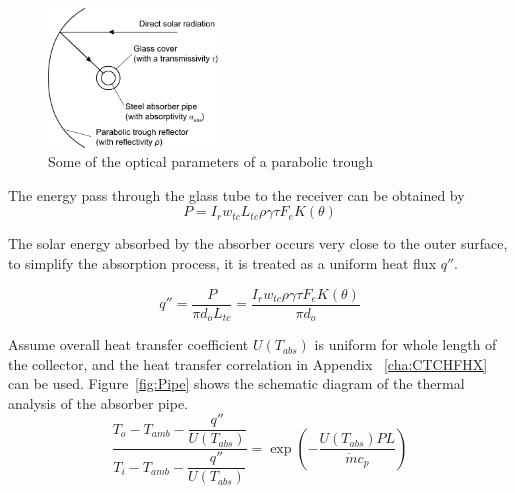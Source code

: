 \begin{figure}[!ht]
\centering
\includegraphics[width=0.4\textwidth]{fig/ParametersOfParablicDish.pdf}
\caption{Some of the optical parameters of a parabolic trough}\label{fig:ParabolicTrough}
\end{figure}

The energy pass through the glass tube to the receiver can be obtained by
\begin{equation}
  P = I_r w_{tc} L_{tc} \rho \gamma \tau F_e K(\theta)
\end{equation}

The solar energy absorbed by the absorber occurs very close to the outer surface, to simplify the absorption process, it is treated as a uniform heat flux $q''$.

\begin{equation}
  q''= \frac{P}{\pi d_o L_{tc}} = \frac{I_r w_{tc} \rho \gamma \tau F_e K(\theta)}{\pi d_o}
\end{equation}
%
%

Assume overall heat transfer coefficient $U(T_{abs})$ is uniform for whole length of the collector, and the heat transfer correlation in Appendix ~\ref{cha:CTCHFHX} can be used. Figure~\ref{fig:Pipe} shows the schematic diagram of the thermal analysis of the absorber pipe.
\begin{equation}
	\frac{T_{o}-T_{amb}-\dfrac{q''}{U(T_{abs})}}{T_{i}-T_{amb}-\dfrac{q''}{U(T_{abs})}}=\exp(-\frac{U(T_{abs})PL}{\dot{m}c_{p}})\label{eq:CTCHF}
\end{equation}


